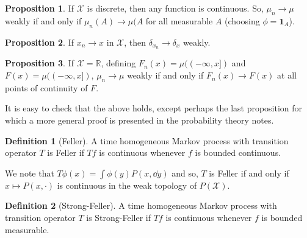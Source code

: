 \documentclass[]{article}
\theoremstyle{definition}
\theoremstyle{definition}
\newtheorem{definition}{Definition}[section]
\newtheorem{proposition}{Proposition}[section]
\begin{document}
\begin{proposition}
  If \(\mathcal{X}\) is discrete, then any function is continuous. So, 
  \(\mu_n \to \mu\) weakly if and only if \(\mu_n(A) \to \mu(A\) for all 
  measurable \(A\) (choosing \(\phi = \mathbf{1}_A\)). 
\end{proposition}

\begin{proposition}
  If \(x_n \to x\) in \(\mathcal{X}\), then \(\delta_{x_n} \to \delta_x\) weakly.
\end{proposition}

\begin{proposition}
  If \(\mathcal{X} = \mathbb{R}\), defining \(F_n(x) = \mu((-\infty, x])\) 
  and \(F(x) = \mu((-\infty, x])\), \(\mu_n \to \mu\) weakly if and only if 
  \(F_n(x) \to F(x)\) at all points of continuity of \(F\).
\end{proposition}

It is easy to check that the above holds, except perhaps the last proposition 
for which a more general proof is presented in the probability theory notes.

\begin{definition}[Feller]
  A time homogeneous Markov process with transition operator \(T\) is Feller 
  if \(Tf\) is continuous whenever \(f\) is bounded continuous.
\end{definition}

We note that \(T \phi(x) = \int \phi(y) P(x, \dd y)\) and so, \(T\) is Feller 
if and only if \(x \mapsto P(x, \cdot)\) is continuous in the weak topology of 
\(P(\mathcal{X})\).

\begin{definition}[Strong-Feller]
  A time homogeneous Markov process with transition operator \(T\) is Strong-Feller 
  if \(Tf\) is continuous whenever \(f\) is bounded measurable.
\end{definition}
\end{document}
